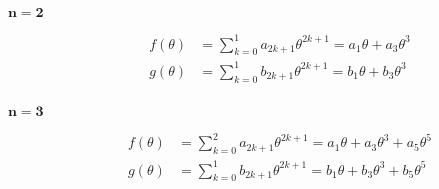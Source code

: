 \documentclass[review]{elsarticle}
\begin{document}
\begin{description}
\item[$\mathbf{n=2}$]

\begin{equation}
\begin{aligned}
f\left(\theta\right)&=\sum_{k=0}^{1}a_{2k+1}\theta^{2k+1}=a_{1}\theta+a_{3}\theta^{3}\\
g\left(\theta\right)&=\sum_{k=0}^{1}b_{2k+1}\theta^{2k+1}=b_{1}\theta+b_{3}\theta^{3}\\
\end{aligned}
\end{equation}

\item[$\mathbf{n=3}$]

\begin{equation}
\begin{aligned}
f\left(\theta\right)&=\sum_{k=0}^{2}a_{2k+1}\theta^{2k+1}=a_{1}\theta+a_{3}\theta^{3}+a_{5}\theta^{5}\\
g\left(\theta\right)&=\sum_{k=0}^{1}b_{2k+1}\theta^{2k+1}=b_{1}\theta+b_{3}\theta^{3}+b_{5}\theta^{5}\\
\end{aligned}
\end{equation}
\end{description}
\end{document}
